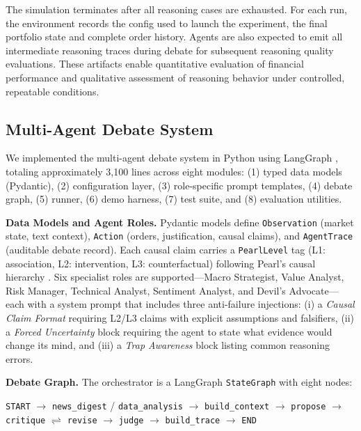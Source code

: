 \documentclass{article}
\begin{document}
The simulation terminates after all reasoning cases are exhausted. For each run, the environment records the config used to launch the experiment, the final portfolio state and complete order history. Agents are also expected to emit all intermediate reasoning traces during debate for subsequent reasoning quality evaluations. These artifacts enable quantitative evaluation of financial performance and qualitative assessment of reasoning behavior under controlled, repeatable conditions.

\subsection{Multi-Agent Debate System}

We implemented the multi-agent debate system in Python using LangGraph \citep{langgraph}, totaling approximately 3,100 lines across eight modules: (1) typed data models (Pydantic), (2) configuration layer, (3) role-specific prompt templates, (4) debate graph, (5) runner, (6) demo harness, (7) test suite, and (8) evaluation utilities.

\textbf{Data Models and Agent Roles.}
Pydantic models define \texttt{Observation} (market state, text context), \texttt{Action} (orders, justification, causal claims), and \texttt{AgentTrace} (auditable debate record). Each causal claim carries a \texttt{PearlLevel} tag (L1: association, L2: intervention, L3: counterfactual) following Pearl's causal hierarchy \citep{pearl2009causality}. Six specialist roles are supported---Macro Strategist, Value Analyst, Risk Manager, Technical Analyst, Sentiment Analyst, and Devil's Advocate---each with a system prompt that includes three anti-failure injections: (i) a \emph{Causal Claim Format} requiring L2/L3 claims with explicit assumptions and falsifiers, (ii) a \emph{Forced Uncertainty} block requiring the agent to state what evidence would change its mind, and (iii) a \emph{Trap Awareness} block listing common reasoning errors.

\textbf{Debate Graph.}
The orchestrator is a LangGraph \texttt{StateGraph} with eight nodes:

\begin{center}
\texttt{START} $\to$ \texttt{news\_digest} / \texttt{data\_analysis} $\to$ \texttt{build\_context} $\to$ \texttt{propose} $\to$ \texttt{critique} $\rightleftharpoons$ \texttt{revise} $\to$ \texttt{judge} $\to$ \texttt{build\_trace} $\to$ \texttt{END}
\end{center}
\end{document}
